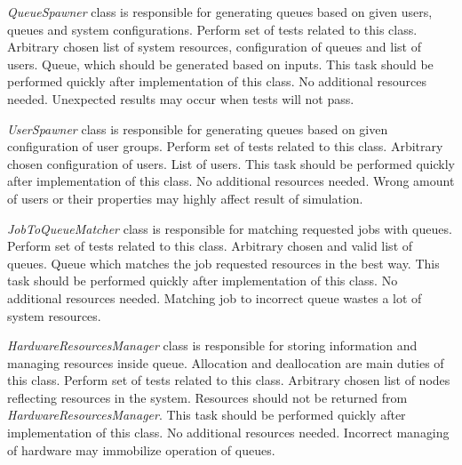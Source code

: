 	{
		{
			\emph{QueueSpawner} class is responsible for generating queues based on given users, queues and system configurations.
		}
		{
			Perform set of tests related to this class. 
		}
		{
			Arbitrary chosen list of system resources, configuration of queues and list of users.
		}
		{
			Queue, which should be generated based on inputs.
		}
		{
			This task should be performed quickly after implementation of this class.
		}
		{
			No additional resources needed.
		}
		{
			Unexpected results may occur when tests will not pass. 
		}
	}

	{
		{
			\emph{UserSpawner} class is responsible for generating queues based on given configuration of user groups.
		}
		{
			Perform set of tests related to this class. 
		}
		{
			Arbitrary chosen configuration of users.  
		}
		{
			List of users.
		}
		{
			This task should be performed quickly after implementation of this class.
		}
		{
			No additional resources needed.
		}
		{
			Wrong amount of users or their properties may highly affect result of simulation.
		}
	}

	{
		{
			\emph{JobToQueueMatcher} class is responsible for matching requested jobs with queues.
		}
		{
			Perform set of tests related to this class. 
		}
		{
			Arbitrary chosen and valid list of queues.  
		}
		{
			Queue which matches the job requested resources in the best way. 
		}
		{
			This task should be performed quickly after implementation of this class.
		}
		{
			No additional resources needed.
		}
		{
			Matching job to incorrect queue wastes a lot of system resources.
		}
	}

	{
		{
			\emph{HardwareResourcesManager} class is responsible for storing information and managing resources inside queue. Allocation and deallocation are main duties of this class.
		}
		{
			Perform set of tests related to this class. 
		}
		{
			Arbitrary chosen list of nodes reflecting resources in the system.  
		}
		{
			Resources should not be returned from \emph{HardwareResourcesManager}.
		}
		{
			This task should be performed quickly after implementation of this class.
		}
		{
			No additional resources needed.
		}
		{
			Incorrect managing of hardware may immobilize operation of queues.
		}
	}

